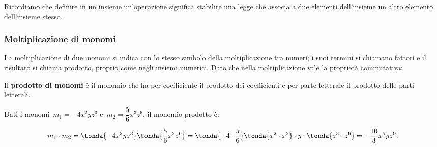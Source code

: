 Ricordiamo che definire in un insieme un'operazione
significa stabilire una legge che associa a due elementi
dell'insieme un altro elemento dell'insieme stesso.

\subsubsection{Moltiplicazione di monomi}
\label{subsubsec:monomi_moltiplicazione}

La moltiplicazione di due monomi si indica con lo stesso simbolo della
moltiplicazione tra numeri; i suoi termini si chiamano fattori e il
risultato si chiama prodotto, proprio come negli insiemi numerici.
Dato che nella moltiplicazione vale la proprietà commutativa:

\begin{definizione}{}{}
Il \textbf{prodotto di monomi}
è il monomio che ha per coefficiente il prodotto dei coefficienti e per 
parte letterale il prodotto delle parti letterali.
\end{definizione}

\begin{esempio}{}{}
Dati i monomi~\(m_{1}=-4x^{2}yz^{3}\) e~\(m_{2}=\dfrac{5}{6}x^{3}z^{6}\),
il monomio prodotto è:

\vspace{-1.5em}
\[m_{1} \cdot m_{2}=\tonda{-4x^{2}yz^{3}} \tonda{\frac{5}{6}x^{3}z^{6}}=
\tonda{-4\cdot {\frac{5}{6}}}\tonda{x^{2}\cdot x^{3}}\cdot 
y\cdot \tonda{z^{3}\cdot z^{6}}=-\frac{10}{3}x^{5}yz^{9}.\]
\end{esempio}


% 

% 

